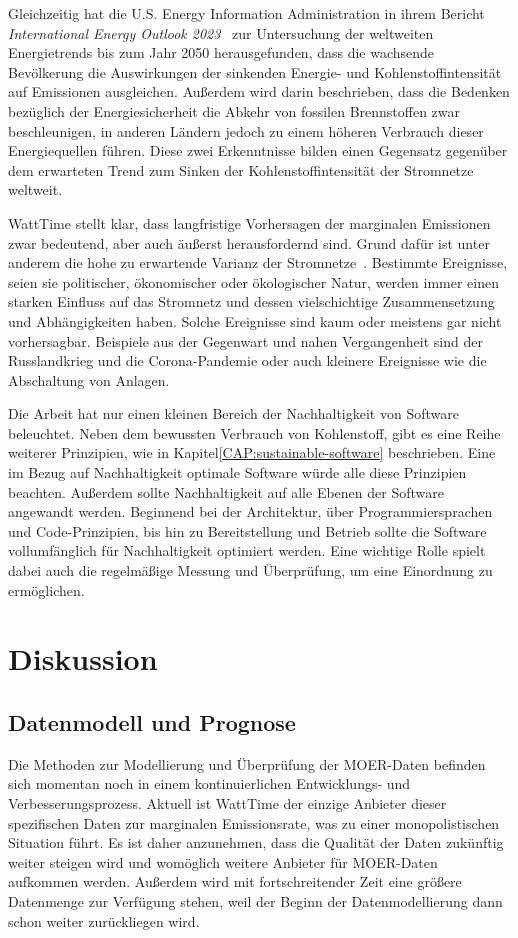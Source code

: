 Gleichzeitig hat die U.S. Energy Information Administration in ihrem Bericht \textit{International Energy Outlook 2023}~\cite{U.S.EnergyInformationAdministration.2023} zur Untersuchung der weltweiten Energietrends bis zum Jahr 2050 herausgefunden, dass die wachsende Bevölkerung die Auswirkungen der sinkenden Energie- und Kohlenstoffintensität auf Emissionen ausgleichen.
Außerdem wird darin beschrieben, dass die Bedenken bezüglich der Energiesicherheit die Abkehr von fossilen Brennstoffen zwar beschleunigen, in anderen Ländern jedoch zu einem höheren Verbrauch dieser Energiequellen führen.
Diese zwei Erkenntnisse bilden einen Gegensatz gegenüber dem erwarteten Trend zum Sinken der Kohlenstoffintensität der Stromnetze weltweit.


WattTime stellt klar, dass langfristige Vorhersagen der marginalen Emissionen zwar bedeutend, aber auch äußerst herausfordernd sind.
Grund dafür ist unter anderem die hohe zu erwartende Varianz der Stromnetze~\cite{WattTime.2022}.
Bestimmte Ereignisse, seien sie politischer, ökonomischer oder ökologischer Natur, werden immer einen starken Einfluss auf das Stromnetz und dessen vielschichtige Zusammensetzung und Abhängigkeiten haben.
Solche Ereignisse sind kaum oder meistens gar nicht vorhersagbar.
Beispiele aus der Gegenwart und nahen Vergangenheit sind der Russlandkrieg und die Corona-Pandemie oder auch kleinere Ereignisse wie die Abschaltung von Anlagen.

Die Arbeit hat nur einen kleinen Bereich der Nachhaltigkeit von Software beleuchtet.
Neben dem bewussten Verbrauch von Kohlenstoff, gibt es eine Reihe weiterer Prinzipien, wie in Kapitel\ref{CAP:sustainable-software} beschrieben.
Eine im  Bezug auf Nachhaltigkeit optimale Software würde alle diese Prinzipien beachten.
Außerdem sollte Nachhaltigkeit auf alle Ebenen der Software angewandt werden.
Beginnend bei der Architektur, über Programmiersprachen und Code-Prinzipien, bis hin zu Bereitstellung und Betrieb sollte die Software vollumfänglich für Nachhaltigkeit optimiert werden.
Eine wichtige Rolle spielt dabei auch die regelmäßige Messung und Überprüfung, um eine Einordnung zu ermöglichen.
\chapter{Diskussion}
\section{Datenmodell und Prognose}
Die Methoden zur Modellierung und Überprüfung der \ac{MOER}-Daten befinden sich momentan noch in einem kontinuierlichen Entwicklungs- und Verbesserungsprozess.
Aktuell ist WattTime der einzige Anbieter dieser spezifischen Daten zur marginalen Emissionsrate, was zu einer monopolistischen Situation führt.
Es ist daher anzunehmen, dass die Qualität der Daten zukünftig weiter steigen wird und womöglich weitere Anbieter für \ac{MOER}-Daten aufkommen werden.
Außerdem wird mit fortschreitender Zeit eine größere Datenmenge zur Verfügung stehen, weil der Beginn der Datenmodellierung dann schon weiter zurückliegen wird.

